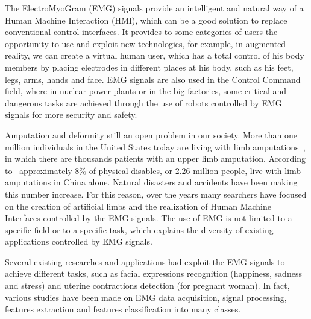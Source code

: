 \documentclass[conference]{IEEEtran}
\begin{document}


The ElectroMyoGram (EMG) signals provide an intelligent and natural way of a Human Machine Interaction (HMI), which can be a good solution to replace conventional control interfaces. It provides to some categories of users the opportunity to use and exploit new technologies, for example, in augmented reality, we can create a virtual human user, which has a total control of his body members by placing electrodes in different places at his body, such as his feet, legs, arms, hands and face. EMG signals are also used in the Control Command field, where in nuclear power plants or in the big factories, some critical and dangerous tasks are achieved through the use of robots controlled by EMG signals for more security and safety. \par
Amputation and deformity still an open problem in our society. More than one million individuals in the United States today are living with limb amputations~\cite{Patricia}, in which there are thousands patients with an upper limb amputation.
According to~\cite{China} approximately 8\% of physical disables, or 2.26 million people, live with limb amputations in China alone. Natural disasters and accidents have been making this number increase. For this reason, over the years many searchers have focused on the creation of artificial limbs and the realization of Human Machine Interfaces controlled by the EMG signals. The use of EMG is not limited to a specific field or to a specific task, which explains the diversity of existing applications controlled by EMG signals. \par
Several existing researches and applications had exploit the EMG signals to achieve different tasks, such as facial expressions recognition (happiness, sadness and stress) and uterine contractions detection (for pregnant woman). In fact, various studies have been made on EMG data acquisition, signal processing, features extraction and features classification into many classes.\par
\end{document}
